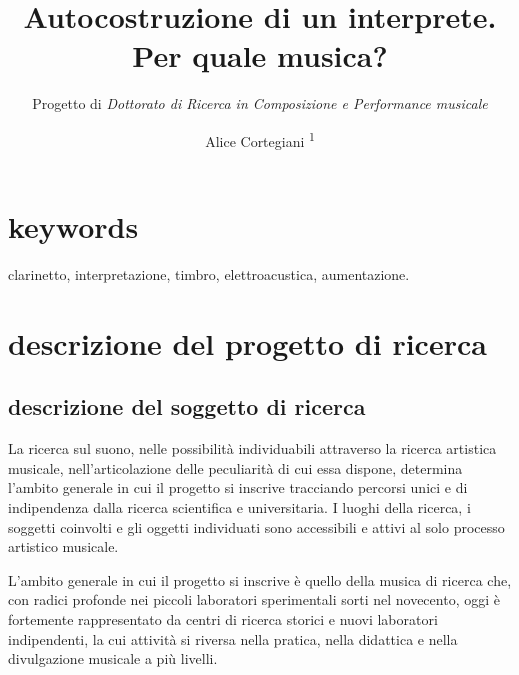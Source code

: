 \documentclass{gs-adonis}
\title{Autocostruzione di un interprete.\\
       Per quale musica?}
\subtitle{Progetto di \emph{Dottorato di Ricerca in Composizione e Performance musicale}}
\author{Alice Cortegiani \textsuperscript{1}}
\begin{document}
\maketitle
\section*{keywords}
clarinetto, interpretazione, timbro, elettroacustica, aumentazione.
\section{descrizione del progetto di ricerca}%
\subsection{descrizione del soggetto di ricerca}%
La ricerca sul suono, nelle possibilità individuabili attraverso la ricerca
artistica musicale, nell'articolazione delle peculiarità di cui essa dispone,
determina l'ambito generale in cui il progetto si inscrive tracciando percorsi
unici e di indipendenza dalla ricerca scientifica e universitaria. I luoghi
della ricerca, i soggetti coinvolti e gli oggetti individuati sono accessibili
e attivi al solo processo artistico musicale.

L'ambito generale in cui il progetto si inscrive è quello della musica di
ricerca che, con radici profonde nei piccoli laboratori sperimentali sorti nel
novecento, oggi è fortemente rappresentato da centri di ricerca storici e
nuovi laboratori indipendenti, la cui attività si riversa nella pratica, nella
didattica e nella divulgazione musicale a più livelli.
\end{document}

